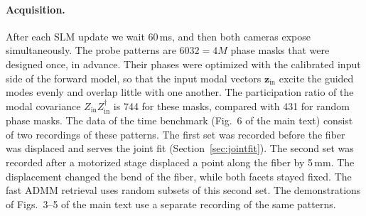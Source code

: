 \documentclass{article}
\begin{document}
\paragraph{Acquisition.}
After each SLM update we wait 60\,ms, and then both cameras expose simultaneously.
The probe patterns are $6032=4M$ phase masks that were designed once, in advance.
Their phases were optimized with the calibrated input side of the forward model, so that the input modal vectors $\mathbf{z}_{\mathrm{in}}$ excite the guided modes evenly and overlap little with one another.
The participation ratio of the modal covariance $Z_{\mathrm{in}}Z_{\mathrm{in}}^{\dagger}$ is 744 for these masks, compared with 431 for random phase masks.
The data of the time benchmark (Fig.~6 of the main text) consist of two recordings of these patterns.
The first set was recorded before the fiber was displaced and serves the joint fit (Section~\ref{sec:jointfit}).
The second set was recorded after a motorized stage displaced a point along the fiber by 5\,mm.
The displacement changed the bend of the fiber, while both facets stayed fixed.
The fast ADMM retrieval uses random subsets of this second set.
The demonstrations of Figs.~3--5 of the main text use a separate recording of the same patterns.

\end{document}
